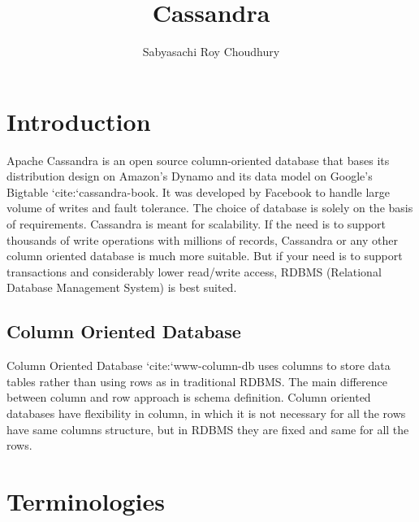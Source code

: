 \documentclass[9pt,twocolumn,twoside]{styles/osajnl}
\title{Cassandra}
\author[1]{Sabyasachi Roy Choudhury}
\affil[1]{School of Informatics and Computing, Bloomington, IN 47408, U.S.A.}
\affil[*]{Corresponding authors: sabyasachi087@gmail.com}
\begin{document}
\maketitle

\section{Introduction}

Apache Cassandra is an open source column-oriented database that bases its distribution design on Amazon’s Dynamo and its data model on Google’s Bigtable {`cite:`cassandra-book}. It was developed by Facebook to handle large volume of writes and fault tolerance. The choice of database is solely on the basis of requirements. Cassandra is meant for scalability. If the need is to support thousands of write operations with millions of records, Cassandra or any other column oriented database  is much more suitable. But if your need is to support transactions and considerably lower read/write access, RDBMS (Relational Database Management System) is best suited.

\subsection{Column Oriented Database}

Column Oriented Database {`cite:`www-column-db} uses columns to store data tables rather than using rows as in traditional RDBMS. The main difference between column and row approach is schema definition. Column oriented databases have flexibility in column, in which it is not necessary for all the rows have same columns structure, but in RDBMS they are fixed and same for all the rows.

\section{Terminologies}
\end{document}
